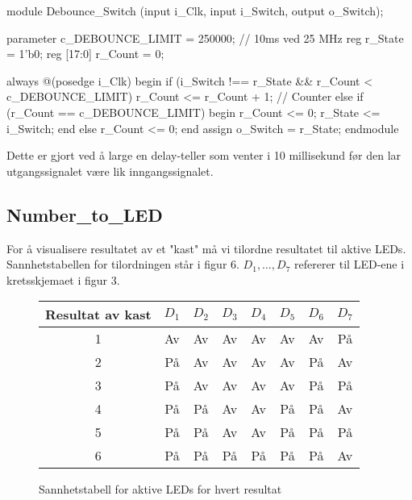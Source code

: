 \begin{verilogcode}
    module Debounce_Switch
        (input i_Clk,
         input i_Switch,
         output o_Switch);

     parameter  c_DEBOUNCE_LIMIT = 250000; // 10ms ved 25 MHz
     reg        r_State = 1'b0;
     reg [17:0] r_Count = 0;

     always @(posedge i_Clk) begin
         if (i_Switch !== r_State && r_Count < c_DEBOUNCE_LIMIT)
             r_Count <= r_Count + 1; // Counter
         else if (r_Count == c_DEBOUNCE_LIMIT) begin
             r_Count <= 0;
             r_State <= i_Switch;
         end
         else
             r_Count <= 0;
     end
     assign o_Switch = r_State;
    endmodule
\end{verilogcode}

Dette er gjort ved å large en delay-teller som venter i 10 millisekund før den lar 
utgangssignalet være lik inngangssignalet.

\subsection{Number\_to\_LED}
For å visualisere resultatet av et "kast" må vi tilordne resultatet til aktive LEDs. 
Sannhetstabellen for tilordningen står i figur 6. $D_1, \dots, D_7$ refererer til LED-ene i kretsskjemaet i figur 3.

\begin{figure}[H]
    \centering
    \begin{tabular}{| c | c c c c c c c |} 
        \hline
        Resultat av kast & $D_1$ & $D_2$ & $D_3$ & $D_4$ & $D_5$ & $D_6$ & $D_7$ \\
        \hline
        1 & Av & Av & Av & Av & Av & Av & På \\ 
        \hline
        2 & På & Av & Av & Av & Av & På & Av \\ 
        \hline
        3 & På & Av & Av & Av & Av & På & På \\ 
        \hline
        4 & På & På & Av & Av & På & På & Av \\ 
        \hline
        5 & På & På & Av & Av & På & På & På \\ 
        \hline
        6 & På & På & På & På & På & På & Av \\ 
        \hline
    \end{tabular}
    \caption{Sannhetstabell for aktive LEDs for hvert resultat}
\end{figure}


